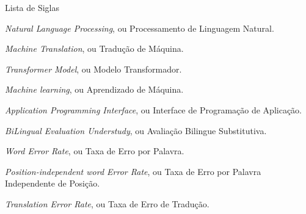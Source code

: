 \begin{siglas}
 \item Lista de Siglas
 \item [$ NLP $] \textit{Natural Language Processing}, ou Processamento de Linguagem Natural.
 \item [$MT$] \textit{Machine Translation}, ou Tradução de Máquina.
 \item [$TM$] \textit{Transformer Model}, ou Modelo Transformador.
 \item [$ML$] \textit{Machine learning}, ou Aprendizado de Máquina.
 \item [$ML$] \textit{Application Programming Interface}, ou Interface de Programação de Aplicação.
 \item [$ BLEU $] \textit{BiLingual Evaluation Understudy}, ou Avaliação Bilingue Substitutiva.
 \item [$ WER $] \textit{Word Error Rate}, ou Taxa de Erro por Palavra.
 \item [$ PER $] \textit{Position-independent word Error Rate}, ou Taxa de Erro por Palavra Independente de Posição.
 \item [$ TER $] \textit{Translation Error Rate}, ou Taxa de Erro de Tradução.
 
 
\end{siglas}





